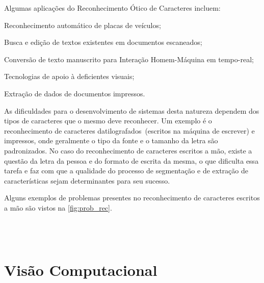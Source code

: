 \documentclass[12pt,oneside,a4paper,chapter=TITLE,section=TITLE,sumario
		=tradicional]{abntex2}
\begin{document}
		Algumas aplicações do Reconhecimento Ótico de Caracteres incluem:
		
		\begin{lista}
			\item Reconhecimento automático de placas de veículos;
			\item Busca e edição de textos existentes em documentos escaneados;
			\item Conversão de texto manuscrito para Interação Homem-Máquina em tempo-real;
			\item Tecnologias de apoio à deficientes visuais;
			\item Extração de dados de documentos impressos.
		\end{lista}
		
		As dificuldades para o desenvolvimento de sistemas desta natureza dependem dos tipos de caracteres que o mesmo deve reconhecer. Um exemplo é o reconhecimento de caracteres datilografados~(escritos na máquina de escrever) e impressos, onde geralmente o tipo da fonte e o tamanho da letra são padronizados.
		No caso do reconhecimento de caracteres escritos a mão, existe a questão da letra da pessoa e do formato de escrita da mesma, o que dificulta essa tarefa e faz com que a qualidade do processo de segmentação e de extração de características sejam determinantes para seu sucesso. 

  		Alguns exemplos de problemas presentes no reconhecimento de caracteres escritos a mão são vistos na \autoref{fig:prob_rec}.
		
		\begin{figure}[H]
			\hspace{2cm}
				\\
			\hspace{2cm}
				\\
			\hspace{2cm}
		\end{figure}
	
		\section{Visão Computacional}
		\label{sec:intro_visi}
		
\end{document}
